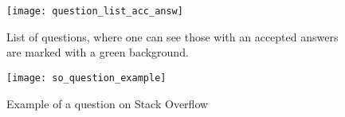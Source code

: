 \clearpage
\begin{figure}[ht]
	\centering
	\texttt{[image: question\_list\_acc\_answ]}
	\caption{List of questions, where one can see those with an accepted answers are marked with a green background.}
	\label{fig:question_list_acc_answ}
\end{figure}


\begin{figure}[ht]
	\centering
	\texttt{[image: so\_question\_example]}
	\caption[Example of a question on Stack Overflow]{Example of a question on Stack Overflow\footnotemark}
	\label{fig:so_question_example}
\end{figure}

